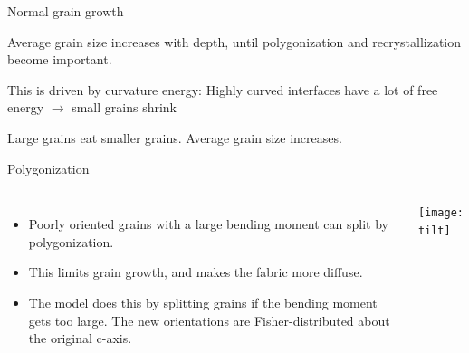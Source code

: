 \documentclass{beamer}
\begin{document}
\begin{frame}{Normal grain growth}
   \begin{itemize} \small{
      \item Average grain size increases with depth, until polygonization and recrystallization become important.
      \item This is driven by curvature energy: Highly curved interfaces have a lot of free energy $\rightarrow$ small grains shrink
      \item Large grains eat smaller grains. Average grain size increases.
      }
   \end{itemize}



\end{frame}


\begin{frame}{Polygonization}
\begin{columns}[T]
   \begin{itemize}
      \item Poorly oriented grains with a large bending moment can split by polygonization. 
      \item This limits grain growth, and makes the fabric more diffuse.
      \item The model does this by splitting grains if the bending moment gets too large. The new orientations are Fisher-distributed about the original c-axis.
   \end{itemize}
   \texttt{[image: tilt]}
\end{columns}
\end{frame}
\end{document}
